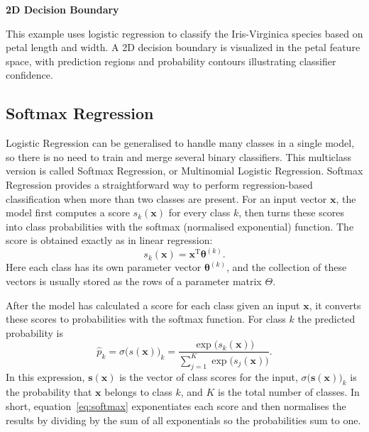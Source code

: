 \documentclass[12pt,letter]{article}
\begin{document}
\begin{example}
\textbf{2D Decision Boundary}

\noindent This example uses logistic regression to classify the Iris-Virginica species based on petal length and width. A 2D decision boundary is visualized in the petal feature space, with prediction regions and probability contours illustrating classifier confidence.
\end{example}



\subsection{Softmax Regression}

Logistic Regression can be generalised to handle many classes in a single model, so there is no need to train and merge several binary classifiers. This multiclass version is called Softmax Regression, or Multinomial Logistic Regression. Softmax Regression provides a straightforward way to perform regression-based classification when more than two classes are present. For an input vector $\mathbf{x}$, the model first computes a score $s_k(\mathbf{x})$ for every class $k$, then turns these scores into class probabilities with the softmax (normalised exponential) function. The score is obtained exactly as in linear regression:
\begin{equation}
s_k(\textbf{x}) = \textbf{x}^\text{T}\pmb{\theta}^{(k)}.
\end{equation}
Here each class has its own parameter vector $\boldsymbol{\theta}^{(k)}$, and the collection of these vectors is usually stored as the rows of a parameter matrix $\Theta$.

After the model has calculated a score for each class given an input $\mathbf{x}$, it converts these scores to probabilities with the softmax function. For class $k$ the predicted probability is
\begin{equation}
\hat{p}_k = \sigma\big(s(\textbf{x}) \big)_k = \frac{\exp \big(s_k(\textbf{x})\big)}{\sum_{j=1}^{K} \exp \big(s_j(\textbf{x}) \big)}.
\label{eq:softmax}
\end{equation}
In this expression, $\mathbf{s}(\mathbf{x})$ is the vector of class scores for the input, $\sigma\bigl(\mathbf{s}(\mathbf{x})\bigr)_k$ is the probability that $\mathbf{x}$ belongs to class $k$, and $K$ is the total number of classes. In short, equation~\ref{eq:softmax} exponentiates each score and then normalises the results by dividing by the sum of all exponentials so the probabilities sum to one.
\end{document}

